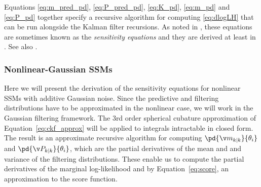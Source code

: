 Equations \eqref{eq:m_pred_pd}, \eqref{eq:P_pred_pd}, \eqref{eq:K_pd}, \eqref{eq:m_pd} and \eqref{eq:P_pd} together specify
a recursive algorithm for computing \eqref{eq:dlogLH} that can be run alongside the Kalman filter recursions.
As noted in \textcite{Cappe2005}, these equations are sometimes known as the \emph{sensitivity equations}
and they are derived at least in \textcite{Gupta1974}. See also
\textcites{Sandell1978,Mbalawata2011}.



\subsubsection{Nonlinear-Gaussian SSMs}\label{sec:grad_nonlinear}%


Here we will present the derivation of the sensitivity equations for nonlinear SSMs with additive
Gaussian noise. Since the predictive and filtering distributions have to be approximated in the nonlinear
case, we will work in the Gaussian filtering framework. The 3rd order spherical cubature approximation
of Equation~\eqref{eq:ckf_approx} will be applied to integrals intractable in closed form. The result
is an approximate recursive algorithm for computing $\pd{\m_{k|k}}{\theta_i}$ and $\pd{\P_{k|k}}{\theta_i}$,
which are the partial derivatives of the mean and and variance of the filtering distributions. These enable
us to compute the partial derivatives of the marginal log-likelihood and by Equation~\eqref{eq:score},
an approximation to the score function.

